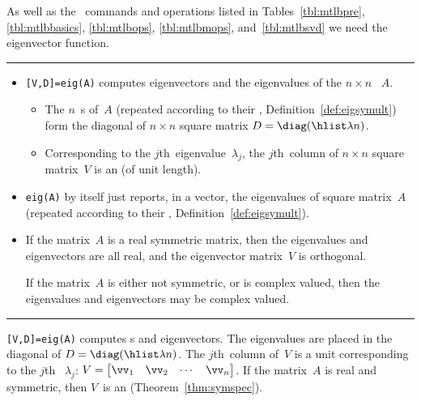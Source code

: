 \begin{table}
\caption{As well as the \script\ commands and operations listed in Tables~\ref{tbl:mtlbpre}, \ref{tbl:mtlbbasics}, \ref{tbl:mtlbops}, \ref{tbl:mtlbmops}, and~\ref{tbl:mtlbsvd}  we need the eigenvector function.} \label{tbl:mtlbeig}
\hrule
\begin{minipage}{\linewidth}
\begin{itemize}
\item {}\verb|[V,D]=eig(A)| computes eigenvectors and the eigenvalues of the  \(n\times n\) ~\(A\).
\begin{itemize}
\item The \(n\)~s of~\(A\) (repeated according to their , Definition~\ref{def:eigsymult}) form the diagonal of \(n\times n\) square matrix \(D=\diag(\hlist\lambda n)\).
\item Corresponding to the \(j\)th~eigenvalue~\(\lambda_j\), the \(j\)th~column of \(n\times n\) square matrix~\(V\) is an  (of unit length).
\end{itemize}
\item \verb|eig(A)| by itself just reports, in a vector, the eigenvalues of square matrix~\(A\) (repeated according to their  , Definition~\ref{def:eigsymult}).

\item If the matrix~\(A\) is a real symmetric matrix, then the eigenvalues and eigenvectors are all real, and the eigenvector matrix~\(V\) is orthogonal.

If the matrix~\(A\) is either not symmetric, or is complex valued, then the eigenvalues and eigenvectors may be complex valued.

\end{itemize}
\end{minipage}
\hrule
\end{table}

\begin{compute}
\verb|[V,D]=eig(A)| computes s and eigenvectors.
The eigenvalues are placed in the diagonal of \(D=\diag(\hlist\lambda n)\). 
The \(j\)th~column of~\(V\) is a unit  corresponding to the \(j\)th ~\(\lambda_j\):
\(V=\begin{bmatrix} \vv_1&\vv_2&\cdots&\vv_n \end{bmatrix}\).
If the matrix~\(A\) is real and symmetric, then \(V\)~is an  (Theorem~\ref{thm:symspec}).
\end{compute}


